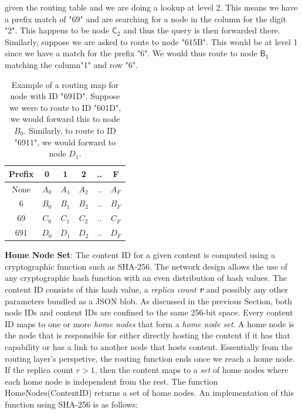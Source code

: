 given the routing table and we are doing a lookup at level 2. This means we have a prefix match of "69" and are
searching for a node in the column for the digit "2". This happens to be node \(\textsf{C}_\textsf{2}\) and thus the query is then
forwarded there. Similarly, suppose we are asked to route to node "615B". This would be at level 1 since we have a match
for the prefix "6". We would thus route to node \(\textsf{B}_\textsf{1}\) matching the column"1" and row "6".
\begin{table}[h]
\begin{center}
    \renewcommand{\arraystretch}{1.5}
\begin{tabular} {| c | c | c | c | c | c |}
    \hline
    Prefix & 0 & 1 & 2 & .. & F \\
    \hline
    \hline
    None & \(A_0\) & \(A_1\) & \(A_2\) & .. & \(A_F\) \\
    6 & \(B_0\) & \(B_1\) & \(B_2\) & .. & \(B_F\) \\
    69 & \(C_0\) & \(C_1\) & \(C_2\) & .. & \(C_F\) \\
    691 & \(D_0\) & \(D_1\) & \(D_2\) & .. & \(D_F\) \\
    \hline
\end{tabular}
\label{table:routing_map}
\caption{Example of a routing map for node with ID "691D". Suppose we were to route to ID "601D", we would forward this
    to node \(B_0\). Similarly, to route to ID "6911", we would forward to node \(D_1\).}
\end{center}
\end{table}
\textbf{\newline Home Node Set}: The content ID for a given content is computed using a cryptographic function such as SHA-256. The
network design allows the use of any cryptographic hash function with an even distribution of hash values. The content ID 
consists of this hash value, a {\em replica count {\bf r}} and possibly any other parameters bundled as a JSON blob.
As discussed in the previous Section, both node IDs and content IDs are confined to the same 256-bit space.  Every content ID
maps to one or more {\em home nodes} that form a {\em home node set}. A home node is the node that is responsible for
either directly hosting the content if it has that capability or has a link to another node that hosts content.
Essentially from the routing layer's perspetive, the routing function ends once we reach a home node. If the replica
count \( r > 1\), then the content maps to a {\em set} of home nodes where each home node is independent from the rest. The function \textsf{HomeNodes(ContentID)} returns a set of home nodes. An implementation of this function using SHA-256 is as follows:
